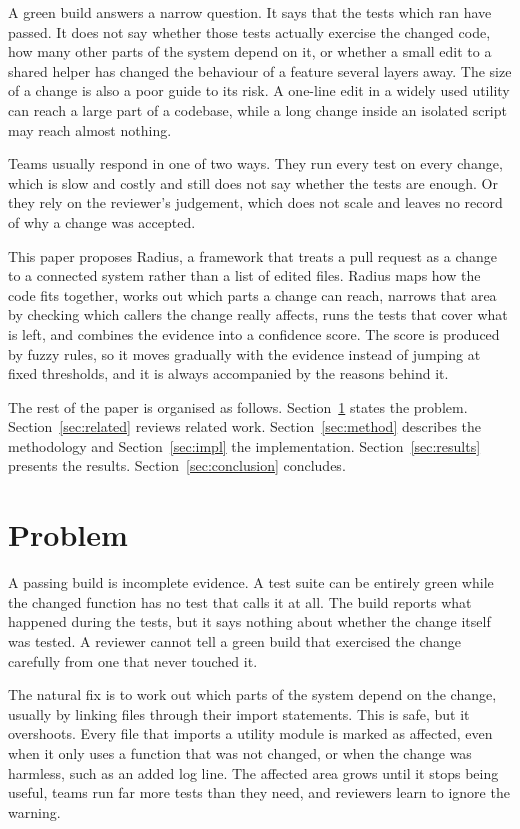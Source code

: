 \documentclass[conference]{IEEEtran}
\begin{document}
A green build answers a narrow question. It says that the tests which ran have passed. It does not say whether those tests actually exercise the changed code, how many other parts of the system depend on it, or whether a small edit to a shared helper has changed the behaviour of a feature several layers away. The size of a change is also a poor guide to its risk. A one-line edit in a widely used utility can reach a large part of a codebase, while a long change inside an isolated script may reach almost nothing.

Teams usually respond in one of two ways. They run every test on every change, which is slow and costly and still does not say whether the tests are enough. Or they rely on the reviewer's judgement, which does not scale and leaves no record of why a change was accepted.

This paper proposes Radius, a framework that treats a pull request as a change to a connected system rather than a list of edited files. Radius maps how the code fits together, works out which parts a change can reach, narrows that area by checking which callers the change really affects, runs the tests that cover what is left, and combines the evidence into a confidence score. The score is produced by fuzzy rules, so it moves gradually with the evidence instead of jumping at fixed thresholds, and it is always accompanied by the reasons behind it.

The rest of the paper is organised as follows. Section~\ref{sec:problems} states the problem. Section~\ref{sec:related} reviews related work. Section~\ref{sec:method} describes the methodology and Section~\ref{sec:impl} the implementation. Section~\ref{sec:results} presents the results. Section~\ref{sec:conclusion} concludes.

\section{Problem}
\label{sec:problems}

A passing build is incomplete evidence. A test suite can be entirely green while the changed function has no test that calls it at all. The build reports what happened during the tests, but it says nothing about whether the change itself was tested. A reviewer cannot tell a green build that exercised the change carefully from one that never touched it.

The natural fix is to work out which parts of the system depend on the change, usually by linking files through their import statements. This is safe, but it overshoots. Every file that imports a utility module is marked as affected, even when it only uses a function that was not changed, or when the change was harmless, such as an added log line. The affected area grows until it stops being useful, teams run far more tests than they need, and reviewers learn to ignore the warning.
\end{document}
